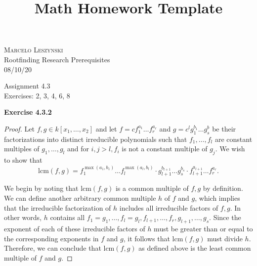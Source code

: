 \documentclass[12pt,oneside]{article}
\newenvironment{exercise}[1]{\vspace{.1in}\noindent\textbf{Exercise #1 \hspace{.05em}}}{}
\begin{document}
\title{Math Homework Template}

\begin{flushright}
\textsc{Marcelo Leszynski}  \\
Rootfinding Research Prerequisites\\
08/10/20
\end{flushright}

\begin{center}
\textsf{Assignment 4.3 } \\
\textsf{Exercises: 2, 3, 4, 6, 8 }
\end{center}


\begin{exercise}{4.3.2}
    \begin{proof}
        Let $f,g \in k[x_1,\ldots,x_2]$ and let $f=cf_1^{a_1}\ldots f_r^{a_r}$ and 
        $g=c^lg_1^{b_1}\ldots g_s^b$ be their factorizations into distinct irreducible 
        polynomials such that $f_1,\ldots,f_l$ are constant multiples of 
        $g_1,\ldots,g_l$ and for $i,j>l, f_i$ is not a constant multiple of $g_j$. 
        We wish to show that 
        \[
            \text{lcm}(f,g) = f_1^{\max(a_1,b_1)}\ldots f_l^{\max(a_l,b_l)}\cdot g_{l+1}^{b_{l+1}}\ldots g_s^{b_s}\cdot f_{l+1}^{a_{l+1}}\ldots f_r^{a_r}.
        \]
        
        We begin by noting that lcm$(f,g)$ is a common multiple of $f,g$ by definition. 
        We can define another arbitrary common multiple $h$ of $f$ and $g$, which implies 
        that the irreducible factorization of $h$ includes all irreducible factors of $f,g$.
        In other words, $h$ contains all 
        $f_1 = g_1,\ldots,f_l = g_l, f_{l+1},\ldots,f_r,g_{l+1},\ldots,g_s$. Since the 
        exponent of each of these irreducible factors of $h$ must be greater than or equal 
        to the corresponding exponents in $f$ and $g$, it follows that lcm$(f,g)$ must 
        divide $h$. Therefore, we can conclude that lcm$(f,g)$ as defined above is 
        the least common multiple of $f$ and $g$.
    \end{proof}
\end{exercise}

\end{document}
